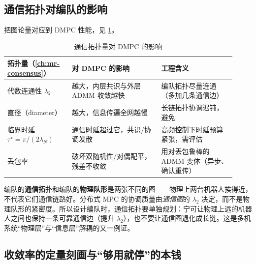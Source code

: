 \subsection{通信拓扑对编队的影响}
\label{sec:dmpc-topo-effect}

把图论量对应到 DMPC 性能，见 \cref{tab:dmpc-topo-effect}。

\begin{table}[H]\centering\small
\caption{通信拓扑量对 DMPC 的影响}
\label{tab:dmpc-topo-effect}
\begin{tabular}{p{0.26\linewidth}p{0.36\linewidth}p{0.30\linewidth}}
\toprule
拓扑量（\cref{ch:mr-consensus}） & 对 DMPC 的影响 & 工程含义 \\
\midrule
代数连通性 $\lambda_2$ & 越大，内层共识与外层 ADMM 收敛越快 & 编队拓扑尽量连通（多加几条通信边） \\
直径（diameter） & 越大，信息传遍全网越慢 & 长链拓扑协调迟钝，避免 \\
临界时延 $\tau^\star=\pi/(2\lambda_N)$ & 通信时延超过它，共识/协调发散 & 高频控制下时延预算紧张，需评估 \\
丢包率 & 破坏双随机性/对偶配平，残差不收敛 & 用对丢包鲁棒的 ADMM 变体（异步、确认重传） \\
\bottomrule
\end{tabular}
\end{table}

\begin{insight}[通信图与物理队形是两张图]\label{ins:dmpc-two-graphs}
编队的\textbf{通信拓扑}和编队的\textbf{物理队形}是两张不同的图——物理上两台机器人挨得近，不代表它们通信链路好。分布式 MPC 的协调质量由\emph{通信图}的 $\lambda_2$ 决定，而不是物理队形的紧密度。所以设计编队时，通信拓扑要单独规划：宁可让物理上远的机器人之间也保持一条可靠通信边（提升 $\lambda_2$），也不要让通信图退化成长链。这是多机系统“物理层”与“信息层”解耦的又一例证。
\end{insight}

\subsection{收敛率的定量刻画与“够用就停”的本钱}
\label{sec:dmpc-quant}

